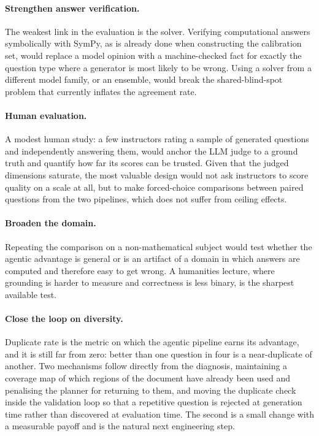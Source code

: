 \paragraph{Strengthen answer verification.} The weakest link in the evaluation is the
solver. Verifying computational answers symbolically with SymPy, as is already
done when constructing the calibration set, would replace a model opinion with a
machine-checked fact for exactly the question type where a generator is most likely
to be wrong. Using a solver from a different model family, or an ensemble, would
break the shared-blind-spot problem that currently inflates the agreement rate.

\paragraph{Human evaluation.} A modest human study: a few instructors rating a
sample of generated questions and independently answering them, would anchor the
LLM judge to a ground truth and quantify how far its scores can be trusted. Given
that the judged dimensions saturate, the most valuable design would not ask
instructors to score quality on a scale at all, but to make forced-choice
comparisons between paired questions from the two pipelines, which does not suffer
from ceiling effects.

\paragraph{Broaden the domain.} Repeating the comparison on a non-mathematical
subject would test whether the agentic advantage is general or is an artifact of a
domain in which answers are computed and therefore easy to get wrong. A humanities
lecture, where grounding is harder to measure and correctness is less binary, is the
sharpest available test.

\paragraph{Close the loop on diversity.} Duplicate rate is the metric on which the
agentic pipeline earns its advantage, and it is still far from zero: better than
one question in four is a near-duplicate of another. Two mechanisms follow directly
from the diagnosis, maintaining a coverage map of which regions of the document
have already been used and penalising the planner for returning to them, and moving
the duplicate check inside the validation loop so that a repetitive question is
rejected at generation time rather than discovered at evaluation time. The second is
a small change with a measurable payoff and is the natural next engineering step.
